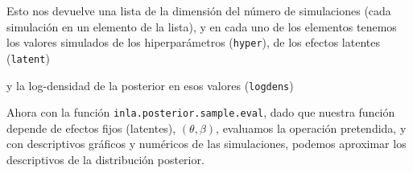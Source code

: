 \documentclass[
]{book}
\newenvironment{Shaded}{\begin{snugshade}}{\end{snugshade}}
\newcommand{\CommentTok}[1]{\textcolor[rgb]{0.56,0.35,0.01}{\textit{#1}}}
\newcommand{\DecValTok}[1]{\textcolor[rgb]{0.00,0.00,0.81}{#1}}
\newcommand{\FunctionTok}[1]{\textcolor[rgb]{0.00,0.00,0.00}{#1}}
\newcommand{\NormalTok}[1]{#1}
\newcommand{\SpecialCharTok}[1]{\textcolor[rgb]{0.00,0.00,0.00}{#1}}
\begin{document}
Esto nos devuelve una lista de la dimensión del número de simulaciones (cada simulación en un elemento de la lista), y en cada uno de los elementos tenemos los valores simulados de los hiperparámetros (\texttt{hyper}), de los efectos latentes (\texttt{latent})

\begin{Shaded}
\end{Shaded}

y la log-densidad de la posterior en esos valores (\texttt{logdens})

\begin{Shaded}
\end{Shaded}

Ahora con la función \texttt{inla.posterior.sample.eval}, dado que nuestra función depende de efectos fijos (latentes), \((\theta,\beta)\), evaluamos la operación pretendida, y con descriptivos gráficos y numéricos de las simulaciones, podemos aproximar los descriptivos de la distribución posterior.
\end{document}
